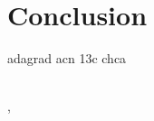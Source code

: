 \chapter{Conclusion}
\label{chap:conclusion}

\lipsum[1]
\cite{example_reference_1}\cite{example_reference_2}\cite{example_reference_3}\cite{example_reference_4}
\lipsum[1] \gls{adagrad} \gls{acn}
\acrshort{13c}
\gls{chca}

~\\[1cm]
\Locality, \Date
~\\[1cm]
\Author
